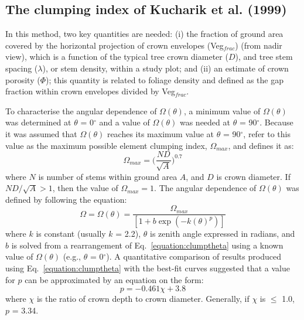 \documentclass[a4paper,11pt]{report}
\begin{document}
\subsection{The clumping index of Kucharik et al. (1999)}

In this method, two key quantities are needed: (i) the fraction of ground area covered by the horizontal projection of crown envelopes (Veg$_{frac}$) (from nadir view), which is a function of the typical tree crown diameter ($D$), and tree stem spacing ($\lambda$), or stem density, within a study plot; and (ii) an estimate of crown porosity ($\Phi$); this quantity is related to foliage density and defined as the gap fraction within crown envelopes divided by Veg$_{frac}$.

To characterise the angular dependence of $\Omega(\theta)$, a minimum value of $\Omega(\theta)$ was determined at $\theta$ = 0$^{\circ}$ and a value of $\Omega(\theta)$ was needed at $\theta$ = 90$^{\circ}$. Because it was assumed that $\Omega(\theta)$ reaches its maximum value at $\theta$ = 90$^{\circ}$, \citet{Kucharik1999} refer to this value as the maximum possible element clumping index, $\Omega_{max}$, and defines it as:
\begin{equation}
\Omega_{max} = \Big(\frac{ND}{\sqrt{A}}\Big)^{0.7}
\label{equation:clumpmax}
\end{equation}
\noindent where $N$ is number of stems within ground area $A$, and $D$ is crown diameter. If $ND/\sqrt{A} > 1$, then the value of $\Omega_{max} = 1$. The angular dependence of $\Omega(\theta)$ was defined by \citet{Kucharik1999} following the equation: 
\begin{equation}
\Omega = \Omega(\theta) = \frac{\Omega_{max}}{[1 + b\exp(-k(\theta)^p)]}
\label{equation:clumptheta}
\end{equation}
\noindent where $k$ is constant (usually $k$ = 2.2), $\theta$ is zenith angle expressed in radians, and $b$ is solved from a rearrangement of Eq.~\ref{equation:clumptheta} using a known value of $\Omega(\theta)$ (e.g., $\theta$ = 0$^{\circ}$). A quantitative comparison of results produced using Eq.~\ref{equation:clumptheta} with the best-fit curves suggested that a value for $p$ can be approximated by an equation on the form:
\begin{equation}
p = -0.461\chi + 3.8
\label{equation:pchi}
\end{equation}
\noindent where $\chi$ is the ratio of crown depth to crown diameter. Generally, if $\chi$ is $\leq$ 1.0, $p$ = 3.34. 
\end{document}
